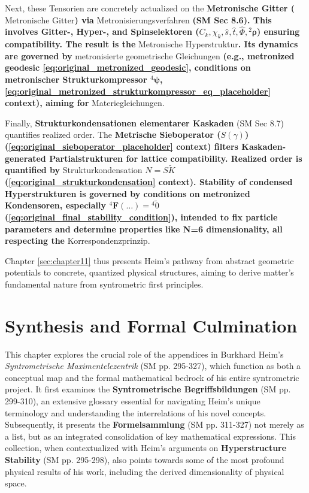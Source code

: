 \documentclass[
    12pt,              %
    a4paper,           %
    headings=normal,   %
    twoside=true,      %
    BCOR=8mm,          %
]{scrbook}
\newcommand{\metronischegitter}{\text{Metronische Gitter}}
\newcommand{\metronintegral}{S}
\newcommand{\metrischesieboperator}{S(\gamma)}
\newcommand{\metronischerstrukturkompressor}{{}^4\bm{\psi}}
\newcommand{\metronisiertekondensor}[1]{{}^{#1}\mathbf{F}}
\begin{document}
Next, these Tensorien are concretely actualized on the \textbf{Metronische Gitter (\(\metronischegitter\)) via }Metronisierungsverfahren\textbf{ (SM Sec 8.6). This involves Gitter-, Hyper-, and Spinselektoren (\(C_k, \chi_k, \hat{s}, \hat{t}, \hat{\Phi}, {}^2\bm{\rho}\)) ensuring compatibility. The result is the }Metronische Hyperstruktur\textbf{. Its dynamics are governed by }metronisierte geometrische Gleichungen\textbf{ (e.g., metronized geodesic \eqref{eq:original_metronized_geodesic}, conditions on metronischer Strukturkompressor \(\metronischerstrukturkompressor\), \eqref{eq:original_metronized_strukturkompressor_eq_placeholder} context), aiming for }Materiegleichungen.

Finally, \textbf{Strukturkondensationen elementarer Kaskaden} (SM Sec 8.7) quantifies realized order. The \textbf{Metrische Sieboperator (\(\metrischesieboperator\)) (\eqref{eq:original_sieboperator_placeholder} context) filters Kaskaden-generated Partialstrukturen for lattice compatibility. Realized order is quantified by }Strukturkondensation \(N = \metronintegral\tilde{K}\)\textbf{ (\eqref{eq:original_strukturkondensation} context). Stability of condensed Hyperstrukturen is governed by conditions on metronized Kondensoren, especially \(\metronisiertekondensor{4}(\dots) = {}^{4}\tilde{0}\) (\eqref{eq:original_final_stability_condition}), intended to fix particle parameters and determine properties like N=6 dimensionality, all respecting the }Korrespondenzprinzip.

Chapter \ref{sec:chapter11} thus presents Heim's pathway from abstract geometric potentials to concrete, quantized physical structures, aiming to derive matter's fundamental nature from syntrometric first principles.

\clearpage

\chapter{Synthesis and Formal Culmination}
\label{sec:appendix}
This chapter explores the crucial role of the appendices in Burkhard Heim's \textit{Syntrometrische Maximentelezentrik} (SM pp. 295-327), which function as both a conceptual map and the formal mathematical bedrock of his entire syntrometric project. It first examines the \textbf{Syntrometrische Begriffsbildungen} (SM pp. 299-310), an extensive glossary essential for navigating Heim's unique terminology and understanding the interrelations of his novel concepts. Subsequently, it presents the \textbf{Formelsammlung} (SM pp. 311-327) not merely as a list, but as an integrated consolidation of key mathematical expressions. This collection, when contextualized with Heim's arguments on \textbf{Hyperstructure Stability} (SM pp. 295-298), also points towards some of the most profound physical results of his work, including the derived dimensionality of physical space.
\end{document}
